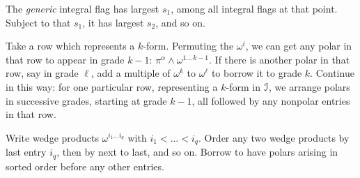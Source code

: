 The \emph{generic} integral flag has largest \(s_1\), among all integral flags at that point.
Subject to that \(s_1\), it has largest \(s_2\), and so on.

Take a row which represents a \(k\)-form.
Permuting the \(\omega^i\), we can get any polar in that row to appear in grade \(k-1\): \(\pi^{\alpha}\wedge\omega^{1\dots \, k-1}\).
If there is another polar in that row, say in grade \(\ell\), add a multiple of \(\omega^k\) to \(\omega^{\ell}\) to borrow it to grade \(k\).
Continue in this way: for one particular row, representing a \(k\)-form in \(\mathcal{I}\), we arrange polars in successive grades, starting at grade \(k-1\), all followed by any nonpolar entries in that row.

Write wedge products \(\omega^{i_1\dots i_q}\) with \(i_1<\dots<i_q\).
Order any two wedge products by last entry \(i_q\), then by next to last, and so on.
Borrow to have polars arising in sorted order before any other entries.

